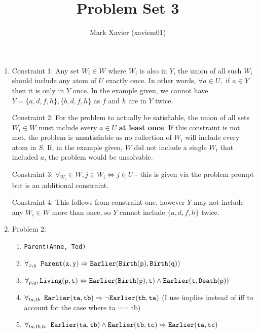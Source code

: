 \documentclass{article}
\title{Problem Set 3}
\author{Mark Xavier (xaviem01)}
\begin{document}
	\maketitle
	
	\begin{enumerate}
		
		\item Constraint 1: Any set $W_i \in W$ where $W_i$ is also in $Y$, the union of all such $W_i$ should include any atom of $U$ exactly once.  In other words, $\forall a \in U,$ if $a \in Y$ then it is only in $Y$ once. In the example given, we cannot have $Y=\{a,d,f,h\}, \{b,d,f,h\}$ as $f$ and $h$ are in $Y$ twice.
		
		Constraint 2: For the problem to actually be satisfiable, the union of all sets $W_i \in W$ must include every $a \in U$ \textbf{at least once}.  If this constraint is not met, the problem is unsatisfiable as no collection of $W_i$ will include every atom in $S$.  If, in the example given, $W$ did not include a single $W_i$ that included $a$, the problem would be unsolvable.
		
		Constraint 3: $\forall_{W_i} \in W, j \in W_i \Leftrightarrow j \in U$ - this is given via the problem prompt but is an additional constraint. 
		
		Constraint 4: This follows from constraint one, however $Y$ may not include any $W_i \in W$ more than once, so $Y$ cannot include $\{a,d,f,h\}$ twice.
		
		\item Problem 2:
			
			\begin{enumerate}
				
				\item {\tt Parent(Anne, Ted)}
				
				\item $\forall_{x, y} \phantom{a} {\tt Parent(x, y) \Rightarrow Earlier(Birth(p), Birth(q))}$
				
				\item $\forall_{p,q}, {\tt Living(p, t) \Leftrightarrow Earlier(Birth(p), t) \wedge Earlier(t, Death(p))}$
				
				\item $\forall_{ta, tb} \phantom{a} {\tt Earlier(ta,tb) \Rightarrow \neg Earlier(tb,ta)}$ (I use implies instead of iff to account for the case where ta == tb)
				
				\item $\forall_{ta,tb,tc} \phantom{a} {\tt Earlier(ta,tb) \wedge Earlier(tb, tc) \Rightarrow Earlier(ta, tc)}$
				

\end{enumerate}
\end{enumerate}
\end{document}
